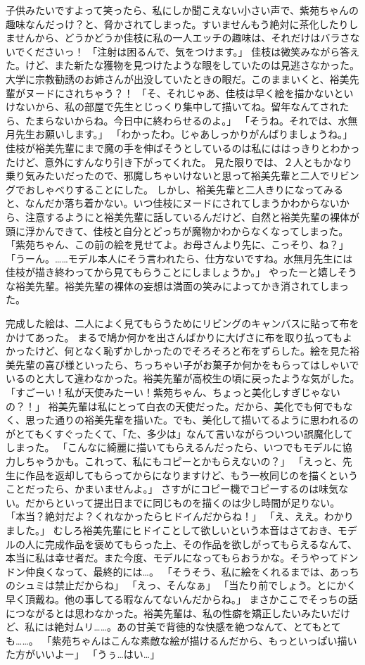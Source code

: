 子供みたいですよって笑ったら、私にしか聞こえない小さい声で、紫苑ちゃんの趣味なんだっけ？と、脅かされてしまった。すいませんもう絶対に茶化したりしませんから、どうかどうか佳枝に私の一人エッチの趣味は、それだけはバラさないでくださいっ！
「注射は困るんで、気をつけます。」
佳枝は微笑みながら答えた。けど、また新たな獲物を見つけたような眼をしていたのは見逃さなかった。大学に宗教勧誘のお姉さんが出没していたときの眼だ。このままいくと、裕美先輩がヌードにされちゃう？！
「そ、それじゃあ、佳枝は早く絵を描かないといけないから、私の部屋で先生とじっくり集中して描いてね。留年なんてされたら、たまらないからね。今日中に終わらせるのよ。」
「そうね。それでは、水無月先生お願いします。」
「わかったわ。じゃあしっかりがんばりましょうね。」
佳枝が裕美先輩にまで魔の手を伸ばそうとしているのは私にははっきりとわかったけど、意外にすんなり引き下がってくれた。
見た限りでは、２人ともかなり乗り気みたいだったので、邪魔しちゃいけないと思って裕美先輩と二人でリビングでおしゃべりすることにした。
しかし、裕美先輩と二人きりになってみると、なんだか落ち着かない。いつ佳枝にヌードにされてしまうかわからないから、注意するようにと裕美先輩に話しているんだけど、自然と裕美先輩の裸体が頭に浮かんできて、佳枝と自分とどっちが魔物かわからなくなってしまった。
「紫苑ちゃん、この前の絵を見せてよ。お母さんより先に、こっそり、ね？」
「うーん。……モデル本人にそう言われたら、仕方ないですね。水無月先生には佳枝が描き終わってから見てもらうことにしましょうか。」
やったーと嬉しそうな裕美先輩。裕美先輩の裸体の妄想は満面の笑みによってかき消されてしまった。

完成した絵は、二人によく見てもらうためにリビングのキャンバスに貼って布をかけてあった。
まるで鳩か何かを出さんばかりに大げさに布を取り払ってもよかったけど、何となく恥ずかしかったのでそろそろと布をずらした。絵を見た裕美先輩の喜び様といったら、ちっちゃい子がお菓子か何かをもらってはしゃいでいるのと大して違わなかった。裕美先輩が高校生の頃に戻ったような気がした。
「すごーい！私が天使みたーい！紫苑ちゃん、ちょっと美化しすぎじゃないの？！」
裕美先輩は私にとって白衣の天使だった。だから、美化でも何でもなく、思った通りの裕美先輩を描いた。でも、美化して描いてるように思われるのがとてもくすぐったくて、「た、多少は」なんて言いながらついつい誤魔化してしまった。
「こんなに綺麗に描いてもらえるんだったら、いつでもモデルに協力しちゃうかも。これって、私にもコピーとかもらえないの？」
「えっと、先生に作品を返却してもらってからになりますけど、もう一枚同じのを描くということだったら、かまいませんよ。」
さすがにコピー機でコピーするのは味気ない。だからといって提出日までに同じものを描くのは少し時間が足りない。
「本当？絶対だよ？くれなかったらヒドイんだからね！」
「え、ええ。わかりました。」
むしろ裕美先輩にヒドイことして欲しいという本音はさておき、モデルの人に完成作品を褒めてもらった上、その作品を欲しがってもらえるなんて、本当に私は幸せ者だ。また今度、モデルになってもらおうかな。そうやってドンドン仲良くなって、最終的には…。
「そうそう、私に絵をくれるまでは、あっちのシュミは禁止だからね」
「えっ、そんなぁ」
「当たり前でしょう。とにかく早く頂戴ね。他の事してる暇なんてないんだからね。」
まさかここでそっちの話につながるとは思わなかった。裕美先輩は、私の性癖を矯正したいみたいだけど、私には絶対ムリ……。あの甘美で背徳的な快感を絶つなんて、とてもとても……。
「紫苑ちゃんはこんな素敵な絵が描けるんだから、もっといっぱい描いた方がいいよー」
「うぅ…はい…」



